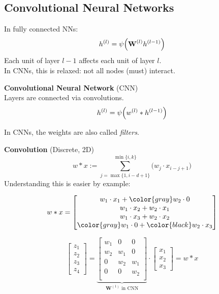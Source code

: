 \newpage

\subsection{Convolutional Neural Networks}

In fully connected NNs:
$$
    h^{(l)} = \psi\Bigl( \textbf{W}^{(l)} h^{(l-1)} \Bigr)
$$
Each unit of layer $l-1$ affects each unit of layer $l$.\\
In CNNs, this is relaxed: not all nodes (must) interact.

 \textbf{Convolutional Neural Network} (CNN)\\
Layers are connected via convolutions.
$$
    h^{(l)} = \psi\Bigl( w^{(l)} * h^{(l-1)} \Bigr)
$$

{\footnotesize
    \remark In CNNs, the weights are also called \textit{filters}.
}

 \textbf{Convolution} {\footnotesize (Discrete, 2D) } \\
$$
    w * x := \sum_{j=\max\{1,i-d+1\}}^{\min\{i,k\}}\Biggl( w_j\cdot x_{i-j+1} \Biggr)
$$
Understanding this is easier by example:

{\footnotesize
$$
    w*x = \begin{bmatrix}
        w_1 \cdot x_1           + \color{gray}w_2 \cdot 0     \\
        w_1 \cdot x_2           + w_2 \cdot x_1               \\
        w_1 \cdot x_3           + w_2 \cdot x_2               \\
        \color{gray}w_1 \cdot 0 + \color{black}w_2 \cdot x_3
    \end{bmatrix}
$$
}

{\footnotesize
$$
    \begin{bmatrix}
        z_1 \\
        z_2 \\
        z_3 \\
        z_4
    \end{bmatrix} = \underbrace{\begin{bmatrix}
        w_1 & 0     & 0     \\
        w_2 & w_1   & 0     \\
        0   & w_2   & w_1   \\
        0   & 0     & w_2   \\
    \end{bmatrix}}_{\textbf{W}^{(1)} \text{ in CNN}} \cdot \begin{bmatrix}
        x_1 \\
        x_2 \\
        x_3
    \end{bmatrix} = w * x
$$
}

